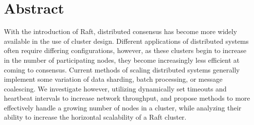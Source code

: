 \section*{Abstract}

\fontsize{10pt}{12pt}\selectfont
With the introduction of Raft, distributed consensus has become more widely available in the use of cluster design. Different applications of distributed systems often require differing configurations, however, as these clusters begin to increase in the number of participating nodes, they become increasingly less efficient at coming to consensus. Current methods of scaling distributed systems generally implement some variation of data sharding, batch processing, or message coalescing. We investigate however, utilizing dynamically set timeouts and heartbeat intervals to increase network throughput, and propose methods to more effectively handle a growing number of nodes in a cluster, while analyzing their ability to increase the horizontal scalability of a Raft cluster.